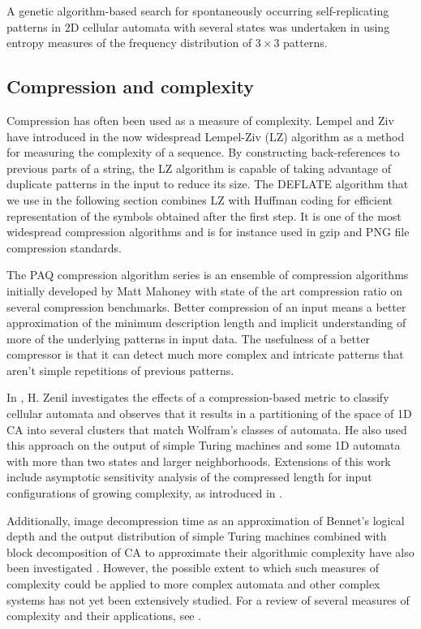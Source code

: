 A genetic algorithm-based search for spontaneously occurring self-replicating
patterns in 2D cellular automata with several states was undertaken in
\parencite{bilottaARTIFICIALMICROWORLDSPART2011} using entropy measures of the
frequency distribution of $3\times 3$ patterns.

\subsection{Compression and complexity}
Compression has often been used as a measure of complexity. Lempel and Ziv have
introduced in \parencite{lempelComplexityFiniteSequences1976} the now widespread
Lempel-Ziv (LZ) algorithm as a method for measuring the complexity of a
sequence. By constructing back-references to previous parts of a string, the LZ
algorithm is capable of taking advantage of duplicate patterns in the input to
reduce its size. The DEFLATE algorithm that we use in the following section
combines LZ with Huffman coding for efficient representation of the symbols
obtained after the first step. It is one of the most widespread compression
algorithms and is for instance used in gzip and PNG file compression standards.

The PAQ compression algorithm series \parencite{mahoneyFastTextCompression2000}
is an ensemble of compression algorithms initially developed by Matt Mahoney
with state of the art compression ratio on several compression benchmarks.
Better compression of an input means a better approximation of the minimum
description length and implicit understanding of more of the underlying patterns
in input data. The usefulness of a better compressor is that it can detect much
more complex and intricate patterns that aren't simple repetitions of previous
patterns.

In \parencite{zenilCompressionBasedInvestigationDynamical2010}, H. Zenil
investigates the effects of a compression-based metric to classify cellular
automata and observes that it results in a partitioning of the space of 1D CA
into several clusters that match Wolfram's classes of automata. He also used
this approach on the output of simple Turing machines and some 1D automata with
more than two states and larger neighborhoods. Extensions of this work include
asymptotic sensitivity analysis of the compressed length for input
configurations of growing complexity, as introduced in
\parencite{zenilAsymptoticBehaviorRatios2013,
  zenilWhatNatureLikeComputation2014}.

Additionally, image decompression time as an approximation of Bennet's logical
depth \parencite{bennettLogicalDepthPhysical1995,
  zenilImageCharacterizationClassification2012} and the output distribution of
simple Turing machines combined with block decomposition of CA to approximate
their algorithmic complexity have also been investigated
\parencite{zenilTwodimensionalKolmogorovComplexity2015,
  soler-toscanoCalculatingKolmogorovComplexity2014}. However, the possible
extent to which such measures of complexity could be applied to more complex
automata and other complex systems has not yet been extensively studied. For a
review of several measures of complexity and their applications, see
\parencite{grassbergerRandomnessInformationComplexity1989}.

